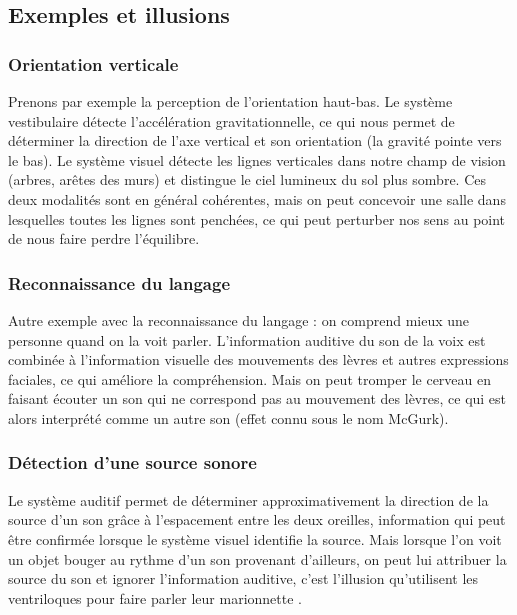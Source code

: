 \subsection{Exemples et illusions}

\subsubsection{Orientation verticale}

Prenons par exemple la perception de l'orientation haut-bas. Le système vestibulaire détecte l'accélération gravitationnelle, ce qui nous permet de déterminer la direction de l'axe vertical et son orientation (la gravité pointe vers le bas). Le système visuel détecte les lignes verticales dans notre champ de vision (arbres, arêtes des murs) et distingue le ciel lumineux du sol plus sombre. Ces deux modalités sont en général cohérentes, mais on peut concevoir une salle dans lesquelles toutes les lignes sont penchées, ce qui peut perturber nos sens au point de nous faire perdre l'équilibre.

\subsubsection{Reconnaissance du langage}

Autre exemple avec la reconnaissance du langage : on comprend mieux une personne quand on la voit parler. L'information auditive du son de la voix est combinée à l'information visuelle des mouvements des lèvres et autres expressions faciales, ce qui améliore la compréhension. Mais on peut tromper le cerveau en faisant écouter un son qui ne correspond pas au mouvement des lèvres, ce qui est alors interprété comme un autre son (effet connu sous le nom McGurk). 

\subsubsection{Détection d'une source sonore}

Le système auditif permet de déterminer approximativement la direction de la source d'un son grâce à l'espacement entre les deux oreilles, information qui peut être confirmée lorsque le système visuel identifie la source. Mais lorsque l'on voit un objet bouger au rythme d'un son provenant d'ailleurs, on peut lui attribuer la source du son et ignorer l'information auditive, c'est l'illusion qu'utilisent les ventriloques pour faire parler leur marionnette \cite{bonath_neural_2007}.

